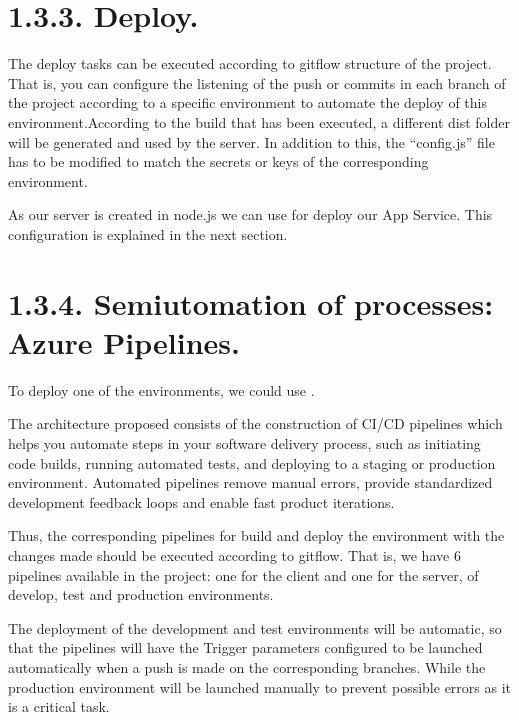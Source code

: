 \documentclass[letterpaper,10pt,english]{sphinxmanual}
\begin{document}
\section{1.3.3. Deploy.}
\label{\detokenize{pages/Environments/Build_deploy:deploy}}
The deploy tasks can be executed according to gitflow structure of the project. That is, you can configure the listening of the push or commits in each branch of the project according to a specific environment to automate the deploy of this environment.According to the build that has been executed, a different dist folder will be generated and used by the server. In addition to this, the “config.js” file has to be modified to match the secrets or keys of the corresponding environment.

As our server is created in node.js we can use  for deploy our App Service. This configuration is explained in the next section.


\section{1.3.4. Semiutomation of processes: Azure Pipelines.}
\label{\detokenize{pages/Environments/Build_deploy:semiutomation-of-processes-azure-pipelines}}
To deploy one of the environments, we could use .

The architecture proposed consists of the construction of CI/CD pipelines which helps you automate steps in your software delivery process, such as initiating code builds, running automated tests, and deploying to a staging or production environment. Automated pipelines remove manual errors, provide standardized development feedback loops and enable fast product iterations.

Thus, the corresponding pipelines for build and deploy the environment with the changes made should be executed according to gitflow. That is, we have 6 pipelines available in the project: one for the client and one for the server, of develop, test and production environments.

The deployment of the development and test environments will be automatic, so that the pipelines will have the Trigger parameters configured to be launched automatically when a push is made on the corresponding branches. While the production environment will be launched manually to prevent possible errors as it is a critical task.
\end{document}
